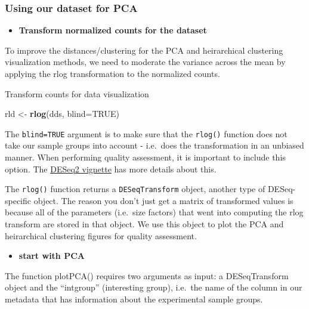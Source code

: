 \documentclass[
]{article}
\newenvironment{Shaded}{\begin{snugshade}}{\end{snugshade}}
\newcommand{\AttributeTok}[1]{\textcolor[rgb]{0.13,0.29,0.53}{#1}}
\newcommand{\ConstantTok}[1]{\textcolor[rgb]{0.56,0.35,0.01}{#1}}
\newcommand{\FunctionTok}[1]{\textcolor[rgb]{0.13,0.29,0.53}{\textbf{#1}}}
\newcommand{\NormalTok}[1]{#1}
\newcommand{\OtherTok}[1]{\textcolor[rgb]{0.56,0.35,0.01}{#1}}
\providecommand{\tightlist}{%
  \setlength{\itemsep}{0pt}\setlength{\parskip}{0pt}}
\begin{document}
\subsubsection{Using our dataset for
PCA}\label{using-our-dataset-for-pca}

\begin{itemize}
\tightlist
\item
  \textbf{Transform normalized counts for the dataset}
\end{itemize}

To improve the distances/clustering for the PCA and heirarchical
clustering visualization methods, we need to moderate the variance
across the mean by applying the rlog transformation to the normalized
counts.

Transform counts for data visualization

\begin{Shaded}
\begin{Highlighting}[]
\NormalTok{rld }\OtherTok{\textless{}{-}} \FunctionTok{rlog}\NormalTok{(dds, }\AttributeTok{blind=}\ConstantTok{TRUE}\NormalTok{)}
\end{Highlighting}
\end{Shaded}

The \texttt{blind=TRUE} argument is to make sure that the
\texttt{rlog()} function does not take our sample groups into account -
i.e.~does the transformation in an unbiased manner. When performing
quality assessment, it is important to include this option. The
\href{https://bioconductor.org/packages/devel/bioc/vignettes/DESeq2/inst/doc/DESeq2.html\#blind-dispersion-estimation}{DESeq2
vignette} has more details about this.

The \texttt{rlog()} function returns a \texttt{DESeqTransform} object,
another type of DESeq-specific object. The reason you don't just get a
matrix of transformed values is because all of the parameters (i.e.~size
factors) that went into computing the rlog transform are stored in that
object. We use this object to plot the PCA and heirarchical clustering
figures for quality assessment.

\begin{itemize}
\tightlist
\item
  \textbf{start with PCA}
\end{itemize}

The function plotPCA() requires two arguments as input: a DESeqTransform
object and the ``intgroup'' (interesting group), i.e.~the name of the
column in our metadata that has information about the experimental
sample groups.
\end{document}

